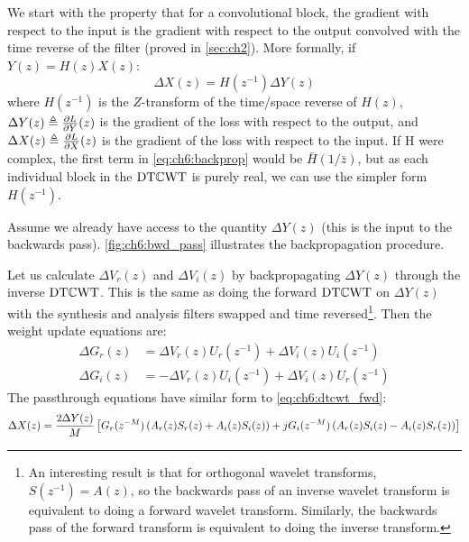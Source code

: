 We start with the property that for a convolutional block, the
gradient with respect to the input is the gradient with respect to the output
convolved with the time reverse of the filter (proved in \autoref{sec:ch2}).
More formally, if $Y(z) = H(z) X(z)$:
%
\begin{equation}\label{eq:ch6:backprop}
  \Delta X(z) = H(z^{-1}) \Delta Y(z)
\end{equation}
%
where $H(z^{-1})$ is the $Z$-transform of the time/space reverse of $H(z)$,
$\Delta Y(z) \triangleq \frac{\partial L}{\partial Y}(z)$ is the gradient of the loss with respect
to the output, and $\Delta X(z) \triangleq \frac{\partial L}{\partial X}(z)$ is the gradient of
the loss with respect to the input. 
If H were complex, the first term in \autoref{eq:ch6:backprop} would be
$\bar{H}(1/\bar{z})$, but as each individual block in the $\mathrm{DT}\mathbb{C}\mathrm{WT}$ is purely
real, we can use the simpler form $H(z^{-1})$. 

Assume we already have access to the quantity $\Delta Y(z)$ (this is the input
to the backwards pass). \autoref{fig:ch6:bwd_pass} illustrates the
backpropagation procedure.

Let us calculate $\Delta V_r(z)$ and $\Delta V_i(z)$ by backpropagating
$\Delta Y(z)$ through the inverse $\mathrm{DT}\mathbb{C}\mathrm{WT}$. This is the same as doing the
forward $\mathrm{DT}\mathbb{C}\mathrm{WT}$ on $\Delta Y(z)$ with the synthesis and analysis filters
swapped and time reversed\footnote{An interesting result is that for orthogonal wavelet
transforms, $S(z^{-1}) = A(z)$, so the backwards pass of an inverse wavelet
transform is equivalent to doing a forward wavelet transform. Similarly, the
backwards pass of the forward transform is equivalent to doing the inverse
transform.}. Then the weight update equations are:
\begin{align}
  \Delta G_r(z) &= \Delta V_r(z) U_r(z^{-1}) + \Delta V_i(z) U_i(z^{-1})  \label{eq:ch6:gr_update}\\
  \Delta G_i(z) &=  -\Delta V_r(z) U_i(z^{-1}) + \Delta V_i(z) U_r(z^{-1})  \label{eq:ch6:gi_update} 
\end{align}
%
The passthrough equations have similar form to \eqref{eq:ch6:dtcwt_fwd}:
\begin{equation}\label{eq:ch6:dtcwt_passthrough}
    \Delta X(z) = \frac{2\Delta Y(z)}{M} \left[G_r(z^{-M})\left( A_r(z)S_r(z) + A_i(z)S_i(z) \right) + \\
       jG_i(z^{-M}) \left(A_r(z)S_i(z) - A_i(z)S_r(z) \right) \right] 
\end{equation}


